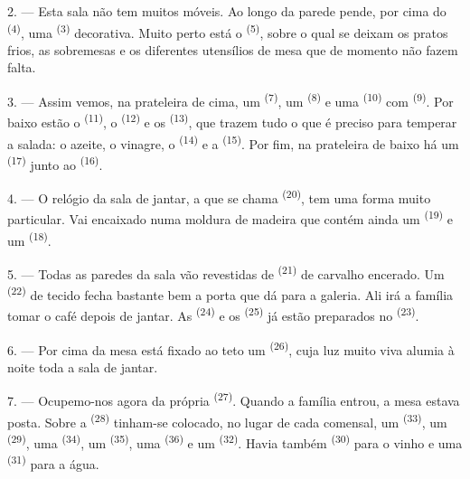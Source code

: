 2. --- Esta sala não tem muitos móveis. Ao longo da parede pende, por
cima do  \textsuperscript{(4)}, uma 
\textsuperscript{(3)} decorativa. Muito perto está o 
\textsuperscript{(5)}, sobre o qual se deixam os pratos frios, as sobremesas e
os diferentes utensílios de mesa que de momento não fazem falta.

3. --- Assim vemos, na prateleira de cima, um 
\textsuperscript{(7)}, um  \textsuperscript{(8)} e uma 
\textsuperscript{(10)} com  \textsuperscript{(9)}. Por baixo estão o
 \textsuperscript{(11)}, o  \textsuperscript{(12)} e os
 \textsuperscript{(13)}, que trazem tudo o que é preciso para
temperar a salada: o azeite, o vinagre, o  \textsuperscript{(14)} e a
 \textsuperscript{(15)}. Por fim, na prateleira de baixo há um
 \textsuperscript{(17)} junto ao 
\textsuperscript{(16)}.

4. --- O relógio da sala de jantar, a que se chama  \textsuperscript{(20)}, tem uma forma muito particular. Vai encaixado
numa moldura de madeira que contém ainda um 
\textsuperscript{(19)} e um  \textsuperscript{(18)}.

\VUsaut{4.6mm}
\VUsaut{3.0mm}

5. --- Todas as paredes da sala vão revestidas de  \textsuperscript{(21)} de carvalho encerado. Um 
\textsuperscript{(22)} de tecido fecha bastante bem a porta que dá para a
galeria. Ali irá a família tomar o café depois de jantar. As
 \textsuperscript{(24)} e os  \textsuperscript{(25)} já
estão preparados no  \textsuperscript{(23)}.

6. --- Por cima da mesa está fixado ao teto um  \textsuperscript{(26)}, cuja luz muito viva alumia à noite toda a
sala de jantar.

7. --- Ocupemo-nos agora da própria 
\textsuperscript{(27)}. Quando a família entrou, a mesa estava posta. Sobre a
 \textsuperscript{(28)} tinham-se colocado, no lugar de cada
comensal, um  \textsuperscript{(33)}, um 
\textsuperscript{(29)}, uma  \textsuperscript{(34)}, um 
\textsuperscript{(35)}, uma  \textsuperscript{(36)} e um 
\textsuperscript{(32)}. Havia também  \textsuperscript{(30)} para o
vinho e uma  \textsuperscript{(31)} para a água.

